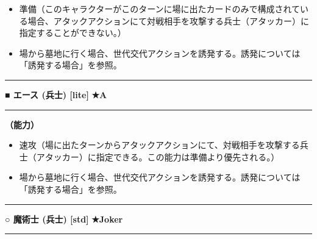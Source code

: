 \documentclass[twocolumn,a5paper,papersize,10pt]{jarticle}
\begin{document}
\vspace{-1zh}%
\begin{itemize}
\setlength{\leftskip}{-0.3cm}
\setlength{\parskip}{0pt} %

\item 準備（このキャラクターがこのターンに場に出たカードのみで構成されている場合、アタックアクションにて対戦相手を攻撃する兵士（アタッカー）に指定することができない。）

\item 場から墓地に行く場合、世代交代アクションを誘発する。誘発については「誘発する場合」を参照。
\vspace{-1zh}%
\end{itemize}
\vspace{2mm} %
\hrule height 0.5mm depth 0mm width 66.5mm %
\vspace{1mm} %
{\normalsize\bf ■ エース {\scriptsize (兵士) [lite]}} %
\hfill 
{\small\bf ★A }

\vspace{1mm}%
\hrule height 0.1mm depth 0mm width 66.5mm %
\vspace{1mm}%

{\bf（能力）}


\vspace{-1zh}%
\begin{itemize}
\setlength{\leftskip}{-0.3cm}
\setlength{\parskip}{0pt} %

\item 速攻（場に出たターンからアタックアクションにて、対戦相手を攻撃する兵士（アタッカー）に指定できる。この能力は準備より優先される。）

\item 場から墓地に行く場合、世代交代アクションを誘発する。誘発については「誘発する場合」を参照。
\vspace{-1zh}%
\end{itemize}
\vspace{2mm} %
\hrule height 0.5mm depth 0mm width 66.5mm %
\vspace{1mm} %
{\normalsize\bf ○ 魔術士 {\scriptsize (兵士) [std]}} %
\hfill 
{\small\bf ★Joker }

\vspace{1mm}%
\hrule height 0.1mm depth 0mm width 66.5mm %
\vspace{1mm}%
\end{document}

